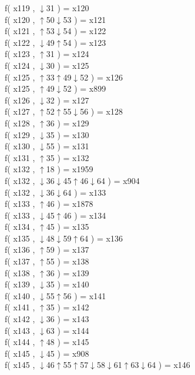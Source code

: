 f( x119 , $\downarrow$31 ) = x120 \\
f( x120 , $\uparrow$50$\downarrow$53 ) = x121 \\
f( x121 , $\uparrow$53$\downarrow$54 ) = x122 \\
f( x122 , $\downarrow$49$\uparrow$54 ) = x123 \\
f( x123 , $\uparrow$31 ) = x124 \\
f( x124 , $\downarrow$30 ) = x125 \\
f( x125 , $\uparrow$33$\uparrow$49$\downarrow$52 ) = x126 \\
f( x125 , $\uparrow$49$\downarrow$52 ) = x899 \\
f( x126 , $\downarrow$32 ) = x127 \\
f( x127 , $\uparrow$52$\uparrow$55$\downarrow$56 ) = x128 \\
f( x128 , $\uparrow$36 ) = x129 \\
f( x129 , $\downarrow$35 ) = x130 \\
f( x130 , $\downarrow$55 ) = x131 \\
f( x131 , $\uparrow$35 ) = x132 \\
f( x132 , $\uparrow$18 ) = x1959 \\
f( x132 , $\downarrow$36$\downarrow$45$\uparrow$46$\downarrow$64 ) = x904 \\
f( x132 , $\downarrow$36$\downarrow$64 ) = x133 \\
f( x133 , $\uparrow$46 ) = x1878 \\
f( x133 , $\downarrow$45$\uparrow$46 ) = x134 \\
f( x134 , $\uparrow$45 ) = x135 \\
f( x135 , $\downarrow$48$\downarrow$59$\uparrow$64 ) = x136 \\
f( x136 , $\uparrow$59 ) = x137 \\
f( x137 , $\uparrow$55 ) = x138 \\
f( x138 , $\uparrow$36 ) = x139 \\
f( x139 , $\downarrow$35 ) = x140 \\
f( x140 , $\downarrow$55$\uparrow$56 ) = x141 \\
f( x141 , $\uparrow$35 ) = x142 \\
f( x142 , $\downarrow$36 ) = x143 \\
f( x143 , $\downarrow$63 ) = x144 \\
f( x144 , $\uparrow$48 ) = x145 \\
f( x145 , $\downarrow$45 ) = x908 \\
f( x145 , $\downarrow$46$\uparrow$55$\uparrow$57$\downarrow$58$\downarrow$61$\uparrow$63$\downarrow$64 ) = x146 \\
